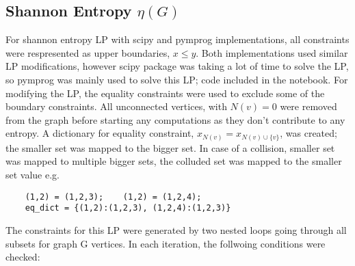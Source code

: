 \documentclass[11pt]{article}
\begin{document}
    \subsection*{Shannon Entropy $\eta(G)$}
    For shannon entropy LP with scipy and pymprog implementations, all constraints were respresented as upper boundaries, $x \le y$. Both implementations used similar LP modifications, however scipy package was taking a lot of time to solve the LP, so pymprog was mainly used to solve this LP; code included in the notebook. For modifying the LP, the equality constraints were used to exclude some of the boundary constraints. All unconnected vertices, with $N(v) = 0$ were removed from the graph before starting any computations as they don't contribute to any entropy. A dictionary for equality constraint, $x_{N(v)} = x_{N(v)\cup \{v\}} $, was created; the smaller set was mapped to the bigger set. In case of a collision, smaller set was mapped to multiple bigger sets, the colluded set was mapped to the smaller set value e.g.
    \begin{lstlisting}
    (1,2) = (1,2,3);    (1,2) = (1,2,4);
    eq_dict = {(1,2):(1,2,3), (1,2,4):(1,2,3)}
    \end{lstlisting}
    The constraints for this LP were generated by two nested loops going through all subsets for graph G vertices. In each iteration, the follwoing conditions were checked:
\end{document}
